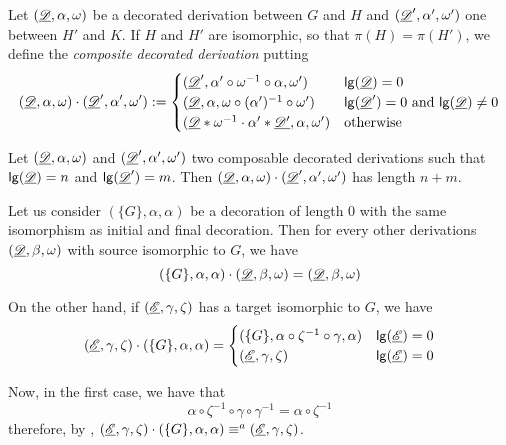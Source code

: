 \begin{definition}\label{def:conc}
	Let $(\underline{\mathscr{D}}, \alpha, \omega)$ be a decorated derivation between $G$ and $H$ and $(\underline{\mathscr{D}}', \alpha', \omega')$ one between $H'$ and $K$. If $H$ and $H'$ are isomorphic, so that $\pi(H)=\pi(H')$, we define the  \emph{composite decorated derivation} putting
	\[(\underline{\mathscr{D}}, \alpha, \omega)\cdot (\underline{\mathscr{D}}', \alpha', \omega'):=\begin{cases}
		(\underline{\mathscr{D}}', \alpha'\circ \omega^{-1}\circ \alpha, \omega')	&\mathsf{lg}(\underline{\mathscr{D}})=0 \\
		(\underline{\mathscr{D}}, \alpha, \omega \circ (\alpha')^{-1}\circ \omega')&\mathsf{lg}(\underline{\mathscr{D}}')=0 \text{ and } \mathsf{lg}(\underline{\mathscr{D}})\neq 0\\
		(\underline{\mathscr{D}}*\omega^{-1}\cdot \alpha'*\underline{\mathscr{D'}}, \alpha, \omega')	&\text{otherwise}
	\end{cases}\]
\end{definition}

\begin{remark}\label{rem:lgt}
	Let $(\underline{\mathscr{D}}, \alpha, \omega)$ and $(\underline{\mathscr{D}}', \alpha', \omega')$ two composable decorated derivations   such that $\mathsf{lg}(\underline{\mathscr{D}})=n$ and $\mathsf{lg}(\underline{\mathscr{D}}')=m$.	 Then $(\underline{\mathscr{D}}, \alpha, \omega)\cdot (\underline{\mathscr{D}}', \alpha', \omega')$ has length $n+m$.
\end{remark}

\begin{remark}\label{rem:id}
	Let us consider  $(\{G\}, \alpha, \alpha)$ be a decoration of length $0$ with the same isomorphism as initial and final decoration. Then for every other derivations $(\underline{\mathscr{D}}, \beta, \omega)$ with source isomorphic to $G$, we have
	\[(\{G\}, \alpha, \alpha)\cdot (\underline{\mathscr{D}}, \beta, \omega) = (\underline{\mathscr{D}}, \beta, \omega)\]
	
	On the other hand, if  $(\underline{\mathscr{E}}, \gamma, \zeta)$  has a target isomorphic to $G$, we have
	\[(\underline{\mathscr{E}}, \gamma, \zeta)\cdot (\{G\}, \alpha, \alpha) = \begin{cases}
		(\{G\}, \alpha \circ \zeta^{-1}\circ \gamma, \alpha)	&\mathsf{lg}(\underline{\mathscr{E}})=0 \\
		(\underline{\mathscr{E}}, \gamma, \zeta )& \mathsf{lg}(\underline{\mathscr{E}})= 0
	\end{cases}\]
	
Now,  in the first case, we have that
\[\alpha \circ \zeta^{-1} \circ \gamma \circ \gamma ^{-1} = \alpha \circ \zeta^{-1}\]
therefore, by , $(\underline{\mathscr{E}}, \gamma, \zeta)\cdot (\{G\}, \alpha, \alpha)\equiv^a  (\underline{\mathscr{E}}, \gamma, \zeta)$.
\end{remark}

